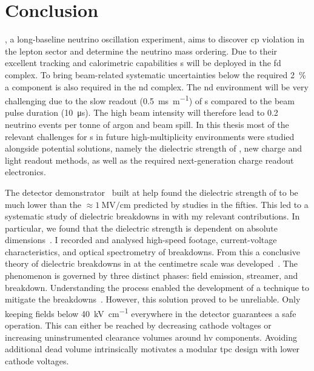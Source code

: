\chapter{Conclusion}
\label{chap:conclusion}

\dune{}, a long-baseline neutrino oscillation experiment, aims to discover \gls{cp} violation in the lepton sector and determine the neutrino mass ordering.
Due to their excellent tracking and calorimetric capabilities \lartpc{}s will be deployed in the \gls{fd} complex.
To bring beam-related systematic uncertainties below the required \SI{2}{\percent} a \lartpc{} component is also required in the \gls{nd} complex.
The \gls{nd} environment will be very challenging due to the slow readout (\SI{0.5}{\milli\second\per\metre}) of \lartpc{}s compared to the beam pulse duration (\SI{10}{\micro\second}).
The high beam intensity will therefore lead to \num{0.2} neutrino events per tonne of argon and beam spill.
In this thesis most of the relevant challenges for \lartpc{}s in future high-multiplicity environments were studied alongside potential solutions, namely the dielectric strength of \lar{}, new charge and light readout methods, as well as the required next-generation charge readout electronics.

The \AT{} detector demonstrator~\cite{AT} built at \gls{help} found the dielectric strength of \lar{} to be much lower than the $\approx \SI{1}{\mega\volt\per\centi\metre}$ predicted by studies in the fifties.
This led to a systematic study of dielectric breakdowns in \lar{} with my relevant contributions.
In particular, we found that the dielectric strength is dependent on absolute dimensions~\cite{breakdown_14}.
I recorded and analysed high-speed footage, current-voltage characteristics, and optical spectrometry of breakdowns.
From this a conclusive theory of dielectric breakdowns in \lar{} at the centimetre scale was developed~\cite{breakdown_16}.
The phenomenon is governed by three distinct phases: field emission, streamer, and breakdown.
Understanding the process enabled the development of a technique to mitigate the breakdowns~\cite{latex}.
However, this solution proved to be unreliable.
Only keeping fields below \SI{40}{\kilo\volt\per\centi\metre} everywhere in the detector guarantees a safe operation.
This can either be reached by decreasing cathode voltages or increasing uninstrumented clearance volumes around \gls{hv} components.
Avoiding additional dead \lar{} volume intrinsically motivates a modular \gls{tpc} design with lower cathode voltages.

